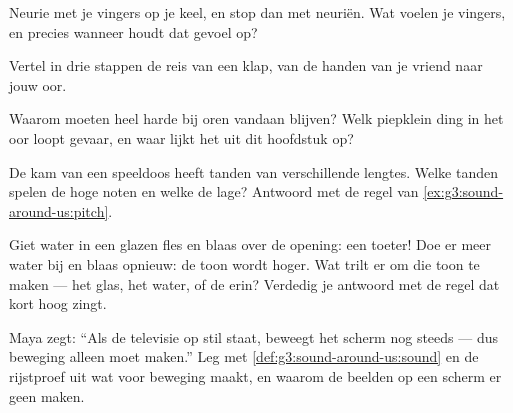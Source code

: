 \begin{exercise}[$\star$]\label{exo:g3:sound-around-us:6}
Neurie met je vingers op je keel, en stop dan met neuriën. Wat voelen
je vingers, en precies wanneer houdt dat gevoel op?
\end{exercise}

\begin{exercise}[$\star$]\label{exo:g3:sound-around-us:7}
Vertel in drie stappen de reis van een klap, van de handen van je
vriend naar jouw oor.
\end{exercise}

\begin{exercise}[$\star$]\label{exo:g3:sound-around-us:8}
Waarom moeten heel harde  bij oren vandaan blijven? Welk
piepklein ding in het oor loopt gevaar, en waar lijkt het uit dit
hoofdstuk op?
\end{exercise}

\begin{exercise}[$\star$]\label{exo:g3:sound-around-us:9}
De kam van een speeldoos heeft tanden van verschillende lengtes. Welke
tanden spelen de hoge noten en welke de lage? Antwoord met de regel
van \cref{ex:g3:sound-around-us:pitch}.
\end{exercise}

\begin{exercise}[$\star\star$]\label{exo:g3:sound-around-us:10}
Giet water in een glazen fles en blaas over de opening: een toeter!
Doe er meer water bij en blaas opnieuw: de toon wordt hoger. Wat trilt
er om die toon te maken --- het glas, het water, of de  erin?
Verdedig je antwoord met de regel dat kort hoog zingt.
\end{exercise}

\begin{exercise}[$\star\star$]\label{exo:g3:sound-around-us:11}
Maya zegt: ``Als de televisie op stil staat, beweegt het scherm nog
steeds --- dus beweging alleen moet  maken.'' Leg met
\cref{def:g3:sound-around-us:sound} en de rijstproef uit wat voor
beweging  maakt, en waarom de beelden op een scherm er geen
maken.
\end{exercise}

